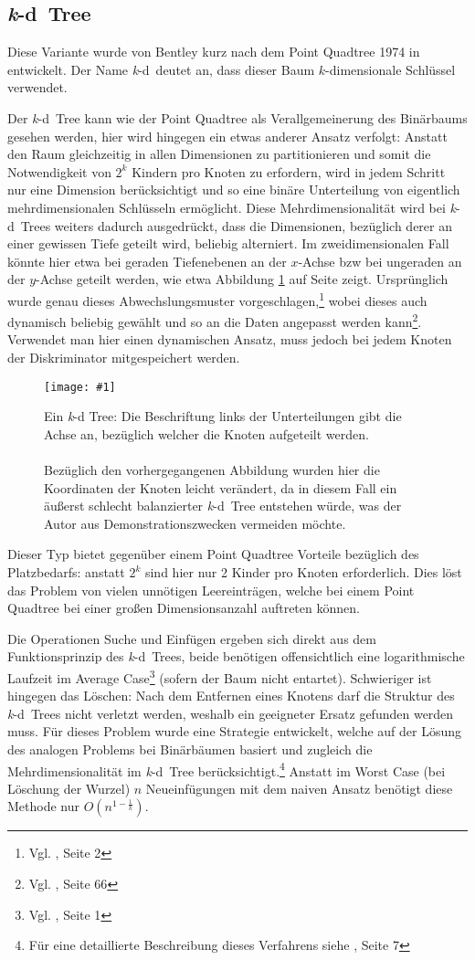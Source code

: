 \documentclass[%
			paper=a4,%
			DIV12,
			draft=false,%
			titlepage
			]{scrartcl}
\newcommand{\zit}[3]{#1 \cite{#2}, #3}
\newcommand{\footzit}[3]{\footnote{\zit{#1}{#2}{#3}}}
\newcommand{\kd}{\mbox{\textit{k}-d}}
\newcommand{\myfig}[4] {
 \begin{figure}[tbph]
	 \centering
	 \texttt{[image: \#1]}
	 \caption{#4}
	 \label{fig:#2}
 \end{figure}
}
\begin{document}
\subsection{\kd\ Tree}
Diese Variante wurde von Bentley kurz nach dem Point Quadtree 1974 in \cite{Bentley:1975} entwickelt. Der Name \kd\ deutet an, dass dieser Baum $k$-dimensionale Schlüssel verwendet. 

Der \kd\ Tree kann wie der Point Quadtree als Verallgemeinerung des Binärbaums gesehen werden, hier wird hingegen ein etwas anderer Ansatz verfolgt:
Anstatt den Raum gleichzeitig in allen Dimensionen zu partitionieren und somit die Notwendigkeit von $2^k$ Kindern pro Knoten zu erfordern, wird in jedem Schritt nur eine Dimension berücksichtigt und so eine binäre Unterteilung von eigentlich mehrdimensionalen Schlüsseln ermöglicht.
Diese Mehrdimensionalität wird bei \kd\ Trees weiters dadurch ausgedrückt, dass die Dimensionen, bezüglich derer an einer gewissen Tiefe geteilt wird, beliebig alterniert.
Im zweidimensionalen Fall könnte hier etwa bei geraden Tiefenebenen an der $x$-Achse bzw bei ungeraden an der $y$-Achse geteilt werden, wie etwa Abbildung \ref{fig:kdtree} auf Seite \pageref{fig:kdtree} zeigt.
Ursprünglich wurde genau dieses Abwechslungsmuster vorgeschlagen,\footzit{Vgl.}{Bentley:1975}{Seite 2}
wobei dieses auch dynamisch beliebig gewählt und so an die Daten angepasst werden kann\footzit{Vgl.}{Samet90}{Seite 66}.
Verwendet man hier einen dynamischen Ansatz, muss jedoch bei jedem Knoten der Diskriminator mitgespeichert werden.

\myfig{img/kdtree-tree-full-trimmed}{kdtree}{width=.78\textwidth}{Ein \textit{k}-d Tree: Die Beschriftung links der Unterteilungen gibt die Achse an, bezüglich welcher die Knoten aufgeteilt werden.
\\ \\
Bezüglich den vorhergegangenen Abbildung wurden hier die Koordinaten der Knoten leicht verändert, da in diesem Fall ein äußerst schlecht balanzierter \kd\ Tree entstehen würde, was der Autor aus Demonstrationszwecken vermeiden möchte.}

Dieser Typ bietet gegenüber einem Point Quadtree Vorteile bezüglich des Platzbedarfs:
anstatt $2^k$ sind hier nur 2 Kinder pro Knoten erforderlich. Dies löst das Problem von vielen unnötigen Leereinträgen, welche bei einem Point Quadtree bei einer großen Dimensionsanzahl auftreten können.

Die Operationen Suche und Einfügen ergeben sich direkt aus dem Funktionsprinzip des \kd\ Trees, beide benötigen offensichtlich eine logarithmische Laufzeit im Average Case\footzit{Vgl.}{Bentley:1975}{Seite 1} (sofern der Baum nicht entartet).
Schwieriger ist hingegen das Löschen:
Nach dem Entfernen eines Knotens darf die Struktur des \kd\ Trees nicht verletzt werden, weshalb ein geeigneter Ersatz gefunden werden muss.
Für dieses Problem wurde eine Strategie entwickelt, welche auf der Lösung des analogen Problems bei Binärbäumen basiert und zugleich die Mehrdimensionalität im \kd\ Tree berücksichtigt.\footzit{Für eine detaillierte Beschreibung dieses Verfahrens siehe}{Bentley:1975}{Seite 7} 
Anstatt im Worst Case (bei Löschung der Wurzel) $n$ Neueinfügungen mit dem naiven Ansatz benötigt diese Methode nur $O(n^{1-\frac{1}{k}})$.
\end{document}
